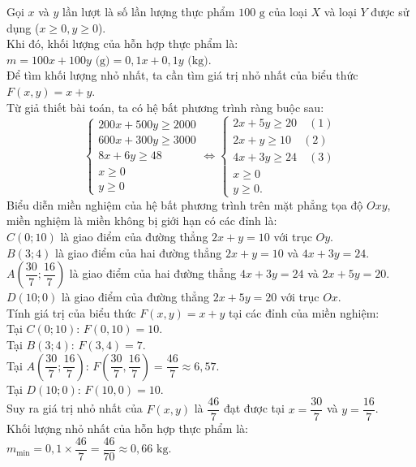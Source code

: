 \begin{ex}
{\begin{center}
\begin{tikzpicture}[line join=round, line cap=round, >=stealth,font=\footnotesize, scale=0.6]
			\end{tikzpicture}
		\end{center}
		Gọi $x$ và $y$ lần lượt là số lần lượng thực phẩm $100\text{ g}$ của loại $X$ và loại $Y$ được sử dụng ($x \ge 0, y \ge 0$).\\
		Khi đó, khối lượng của hỗn hợp thực phẩm là:\\
		$m = 100x + 100y\text{ (g)} = 0{,}1x + 0{,}1y\text{ (kg)}$.\\
		Để tìm khối lượng nhỏ nhất, ta cần tìm giá trị nhỏ nhất của biểu thức $F(x, y) = x + y$.\\
		Từ giả thiết bài toán, ta có hệ bất phương trình ràng buộc sau:\\
		$$\begin{cases} 200x + 500y \ge 2000 \\ 600x + 300y \ge 3000 \\ 8x + 6y \ge 48 \\ x \ge 0 \\ y \ge 0 \end{cases} \Leftrightarrow \begin{cases} 2x + 5y \ge 20 \quad (1) \\ 2x + y \ge 10 \quad (2) \\ 4x + 3y \ge 24 \quad (3) \\ x \ge 0 \\ y \ge 0. \end{cases}$$Biểu diễn miền nghiệm của hệ bất phương trình trên mặt phẳng tọa độ $Oxy$, miền nghiệm là miền không bị giới hạn có các đỉnh là:\\
		$C\left(0; 10\right)$ là giao điểm của đường thẳng $2x + y = 10$ với trục $Oy$.\\
		$B\left(3; 4\right)$ là giao điểm của hai đường thẳng $2x + y = 10$ và $4x + 3y = 24$.\\
		$A\left(\dfrac{30}{7}; \dfrac{16}{7}\right)$ là giao điểm của hai đường thẳng $4x + 3y = 24$ và $2x + 5y = 20$.\\
		$D\left(10; 0\right)$ là giao điểm của đường thẳng $2x + 5y = 20$ với trục $Ox$.\\
		Tính giá trị của biểu thức $F(x, y) = x + y$ tại các đỉnh của miền nghiệm:\\
		Tại $C\left(0; 10\right)$: $F(0, 10) = 10$.\\
		Tại $B\left(3; 4\right)$: $F(3, 4) = 7$.\\
		Tại $A\left(\dfrac{30}{7}; \dfrac{16}{7}\right)$: $F\left(\dfrac{30}{7}, \dfrac{16}{7}\right) = \dfrac{46}{7} \approx 6{,}57$.\\
		Tại $D\left(10; 0\right)$: $F(10, 0) = 10$.\\
		Suy ra giá trị nhỏ nhất của $F(x, y)$ là $\dfrac{46}{7}$ đạt được tại $x = \dfrac{30}{7}$ và $y = \dfrac{16}{7}$.\\
		Khối lượng nhỏ nhất của hỗn hợp thực phẩm là:\\
		$m_{\min} = 0{,}1 \times \dfrac{46}{7} = \dfrac{46}{70} \approx 0{,}66\text{ kg}$.
	}
\end{ex}

